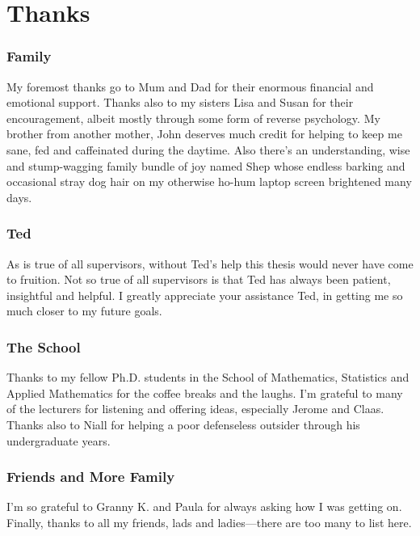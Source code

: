 \chapter*{Thanks}

\subsection*{Family}
My foremost thanks go to Mum and Dad for their enormous financial and emotional support.
Thanks also to my sisters Lisa and Susan for their encouragement, albeit mostly through some form of reverse psychology.
My brother from another mother, John deserves much credit for helping to keep me sane, fed and caffeinated during the daytime.
Also there's an understanding, wise and stump-wagging family bundle of joy named Shep whose endless barking and occasional stray dog hair on my otherwise ho-hum laptop screen brightened many days.

\subsection*{Ted}
As is true of all supervisors, without Ted's help this thesis would never have come to fruition.
Not so true of all supervisors is that Ted has always been patient, insightful and helpful.
I greatly appreciate your assistance Ted, in getting me so much closer to my future goals.

\subsection*{The School}
Thanks to my fellow Ph.D. students in the School of Mathematics, Statistics and Applied Mathematics for the coffee breaks and the laughs.
I'm grateful to many of the lecturers for listening and offering ideas, especially Jerome and Claas.
Thanks also to Niall for helping a poor defenseless outsider through his undergraduate years.

\subsection*{Friends and More Family}
I'm so grateful to Granny K. and Paula for always asking how I was getting on.
Finally, thanks to all my friends, lads and ladies---there are too many to list here.

\newpage